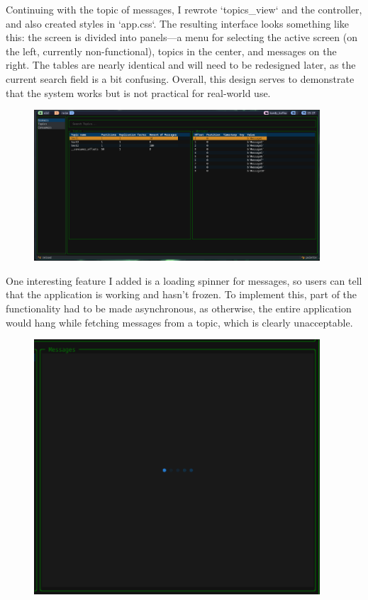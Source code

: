 \documentclass[10pt , a4paper]{report}
\begin{document}
Continuing with the topic of messages, I rewrote `topics\_view` and the controller, and also created styles in `app.css`. The resulting interface looks something like this: the screen is divided into panels—a menu for selecting the active screen (on the left, currently non-functional), topics in the center, and messages on the right. The tables are nearly identical and will need to be redesigned later, as the current search field is a bit confusing. Overall, this design serves to demonstrate that the system works but is not practical for real-world use.

\begin{figure}[htpb]
  \begin{center}
    \includegraphics[width=0.95\textwidth]{imgs/FinalUI.png}
  \end{center}
  \caption{}\label{fig:}
\end{figure}

One interesting feature I added is a loading spinner for messages, so users can tell that the application is working and hasn’t frozen. To implement this, part of the functionality had to be made asynchronous, as otherwise, the entire application would hang while fetching messages from a topic, which is clearly unacceptable.

\begin{figure}[htbp]
  \begin{center}
    \includegraphics[width=0.95\textwidth]{imgs/MessagesSpinner.png}
  \end{center}
  \caption{}\label{fig:}
\end{figure}
\end{document}
